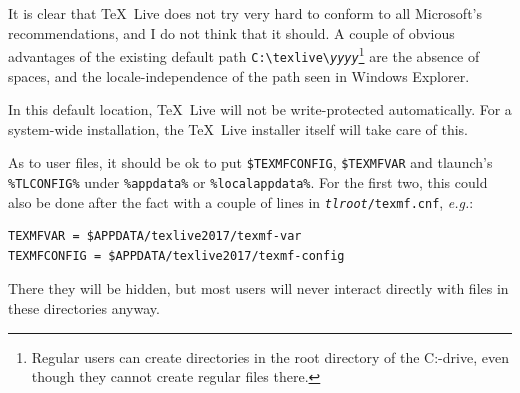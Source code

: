 \documentclass[11pt,a4paper,oneside]{report}
\def\TL{\TeX~Live}
\let\bsl\textbackslash
\def\bslb{\bsl\discretionary{}{}{}}
\begin{document}
It is clear that \TL{} does not try very hard to conform to all
Microsoft's recommendations, and I do not think that it should. A
couple of obvious advantages of the existing default path
\texttt{C:\bslb texlive\bslb \emph{yyyy}}\footnote{Regular users can
  create directories in the root directory of the C:-drive, even
  though they cannot create regular files there.} are the absence of
spaces, and the locale-independence of the path seen in Windows
Explorer.

In this default location, \TL{} will not be write-protected
automatically.  For a system-wide installation, the \TL{} installer
itself will take care of this.

{\sloppy
As to user files, it should be ok to put \texttt{\$TEXMFCONFIG},
\texttt{\$TEXMFVAR} and tlaunch's \texttt{\%TLCONFIG\%} under
\texttt{\%appdata\%} or \texttt{\%localappdata\%}. For the first
two, this could also be done after the fact with a couple of lines
in \texttt{\emph{tlroot}/texmf.cnf}, \emph{e.g.}:
\begin{verbatim}
TEXMFVAR = $APPDATA/texlive2017/texmf-var
TEXMFCONFIG = $APPDATA/texlive2017/texmf-config
\end{verbatim}
There they will be hidden, but most users will never interact
directly with files in these directories anyway.\par}
\end{document}
